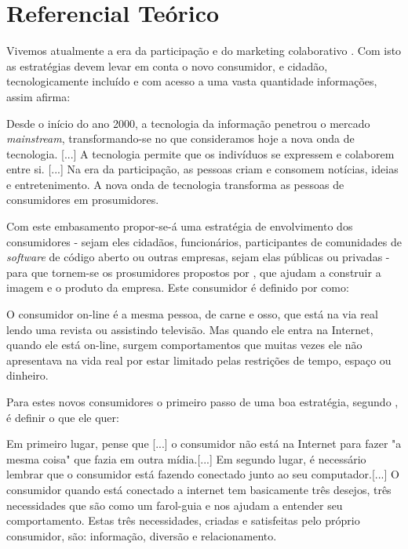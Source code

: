 \chapter{Referencial Teórico}

Vivemos atualmente a era da participação e do marketing colaborativo \cite{Kotler2010}. Com isto as estratégias devem levar em conta o novo consumidor, e cidadão, tecnologicamente incluído e com acesso a uma vasta quantidade informações, assim  afirma:

\begin{citacao}
Desde o início do ano 2000, a tecnologia da informação penetrou o mercado \textit{mainstream}, transformando-se no que consideramos hoje a nova onda de tecnologia. [...] A tecnologia permite que os indivíduos se expressem e colaborem entre si. [...] Na era da participação, as pessoas criam e consomem notícias, ideias e entretenimento. A nova onda de tecnologia transforma as pessoas de consumidores em prosumidores.
\end{citacao}

Com este embasamento propor-se-á uma estratégia de envolvimento dos consumidores - sejam eles cidadãos, funcionários, participantes de comunidades de \textit{software} de código aberto ou outras empresas, sejam elas públicas ou privadas - para que tornem-se os prosumidores propostos por , que ajudam a construir a imagem e o produto da empresa. Este consumidor é definido por  como:

\begin{citacao}
O consumidor on-line é a mesma pessoa, de carne e osso, que está na via real lendo uma revista ou assistindo televisão. Mas quando ele entra na Internet, quando ele está on-line, surgem comportamentos que muitas vezes ele não apresentava na vida real por estar limitado pelas restrições de tempo, espaço ou dinheiro.
\end{citacao}

Para estes novos consumidores o primeiro passo de uma boa estratégia, segundo , é definir o que ele quer:

\begin{citacao}
Em primeiro lugar, pense que [...] o consumidor não está na Internet para fazer "a mesma coisa" que fazia em outra mídia.[...] Em segundo lugar, é necessário lembrar que o consumidor está fazendo conectado junto ao seu computador.[...] O consumidor quando está conectado a internet tem basicamente três desejos, três necessidades que são como um farol-guia e nos ajudam a entender seu comportamento. Estas três necessidades, criadas e satisfeitas pelo próprio consumidor, são: informação, diversão e relacionamento.
\end{citacao}

